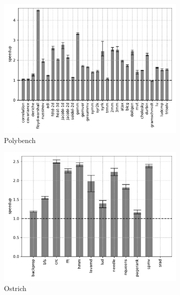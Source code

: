 \begin{figure}
    \centering
    \begin{subfigure}[t]{\textwidth}
        \includegraphics[width=\textwidth]
        {Images/6.1.RQ1/polybench-wasmer-cranelift-opt.pdf}
        \caption{Polybench}
    \end{subfigure}
    \begin{subfigure}[t]{.45\textwidth}
        \includegraphics[width=\textwidth]
        {Images/6.1.RQ1/ostrich-wasmer-cranelift-opt.pdf}
        \caption{Ostrich}
    \end{subfigure}
    \begin{subfigure}[t]{.45\textwidth}

\end{subfigure}
\end{figure}
